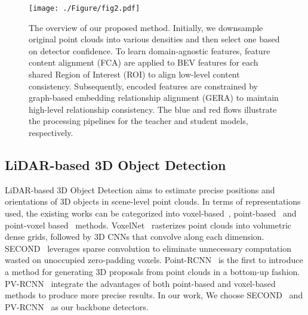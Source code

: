 \begin{figure*}[t!]
\centering
\texttt{[image: ./Figure/fig2.pdf]}
\caption{ The overview of our proposed method. Initially, we downsample original point clouds into various densities and then select one based on detector confidence. To learn domain-agnostic features, feature content alignment (FCA) are applied to BEV features for each shared Region of Interest (ROI) to align low-level content consistency. Subsequently, encoded features are constrained by graph-based embedding relationship alignment (GERA) to maintain high-level relationship consistency. The blue and red flows illustrate the processing pipelines for the teacher and student models, respectively.}

\vspace{-10pt}
\label{fig2}
\end{figure*}

\label{relatedwork}

\subsection{LiDAR-based 3D Object Detection}
LiDAR-based 3D Object Detection aims to estimate precise positions and orientations of 3D objects in scene-level point clouds. In terms of representations used, the existing works can be categorized into voxel-based~\cite{zhou2018voxelnet, yan2018second, yang2018pixor, lang2019pointpillars, shi2020points, deng2021voxel, yin2021center}, point-based~\cite{shi2019pointrcnn, shi2020point} and point-voxel based~\cite{shi2020pv, shi2023pv} methods. VoxelNet~\cite{zhou2018voxelnet} rasterizes point clouds into volumetric dense grids, followed by 3D CNNs that convolve along each dimension. SECOND~\cite{yan2018second} leverages sparse convolution to eliminate unnecessary computation wasted on unoccupied zero-padding voxels. Point-RCNN~\cite{shi2019pointrcnn} is the first to introduce a method for generating 3D proposals from point clouds in a bottom-up fashion. PV-RCNN~\cite{shi2020pv} integrate the advantages of both point-based and voxel-based methods to produce more precise results. In our work, We choose SECOND~\cite{yan2018second} and PV-RCNN~\cite{shi2020pv} as our backbone detectors.

